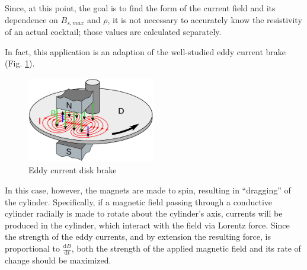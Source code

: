 \documentclass[]{article}
\begin{document}
\par Since, at this point, the goal is to find the form of the current field and its dependence on $B_{s,max}$ and $\rho$, it is not necessary to accurately know the resistivity of an actual cocktail; those values are calculated separately.

\par In fact, this application is an adaption of the well-studied eddy current brake (Fig. \ref{fig:eddy_current_brake}).
\begin{figure}[h!]
	\centering
	\includegraphics[width=0.5\textwidth]{Eddy_current_brake_diagram}
	\caption{Eddy current disk brake}
	\label{fig:eddy_current_brake}
\end{figure}
In this case, however, the magnets are made to spin, resulting in ``dragging'' of the cylinder. Specifically, if a magnetic field passing through a conductive cylinder radially is made to rotate about the cylinder's axis, currents will be produced in the cylinder, which interact with the field via Lorentz force. Since the strength of the eddy currents, and by extension the resulting force, is proportional to $\frac{\mathrm{d}B}{\mathrm{d}t}$, both the strength of the applied magnetic field and its rate of change should be maximized. 
\end{document}
